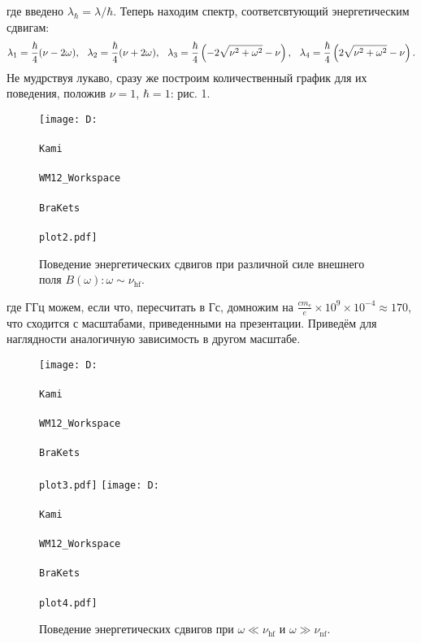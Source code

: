 где введено $\lambda_\hbar = \lambda/\hbar$. Теперь находим спектр, соответсвтующий энергетическим сдвигам:
\begin{equation*}
    \lambda_1 = \frac{\hbar}{4} (\nu -2 \omega ), \hspace{2.5 mm} 
    \lambda_2 =  \frac{\hbar}{4} (\nu +2 \omega ), \hspace{2.5 mm}
    \lambda_3 = \frac{\hbar}{4} \left(-2 \sqrt{\nu ^2+\omega ^2}-\nu \right), \hspace{2.5 mm}
    \lambda_4 = \frac{\hbar}{4} \left(2 \sqrt{\nu ^2+\omega ^2}-\nu \right).
\end{equation*}
Не мудрствуя лукаво, сразу же построим количественный график для их поведения, положив $\nu = 1$, $\hbar = 1$: рис. 1.

\begin{figure}[h]
    \centering
    \texttt{[image: D:\\\\Kami\\\\WM12\_Workspace\\\\BraKets\\\\plot2.pdf]}
    \caption{Поведение энергетических сдвигов при различной силе внешнего поля $B(\omega) \colon \omega \sim \nu_{\text{hf}}$.}
\end{figure}

\noindent
где ГГц можем, если что, пересчитать в Гс, домножим на $\frac{c m_e}{e} \times 10^9 \times 10^{-4} \approx 170$, что сходится с масштабами, приведенными на презентации. Приведём для наглядности аналогичную зависимость в другом масштабе.

\begin{figure}[h]
    \centering
    \texttt{[image: D:\\\\Kami\\\\WM12\_Workspace\\\\BraKets\\\\plot3.pdf]}
    \texttt{[image: D:\\\\Kami\\\\WM12\_Workspace\\\\BraKets\\\\plot4.pdf]}
    \caption{Поведение энергетических сдвигов при  $\omega \ll \nu_{\text{hf}}$ и $\omega \gg \nu_{\text{nf}}$.}
\end{figure}


